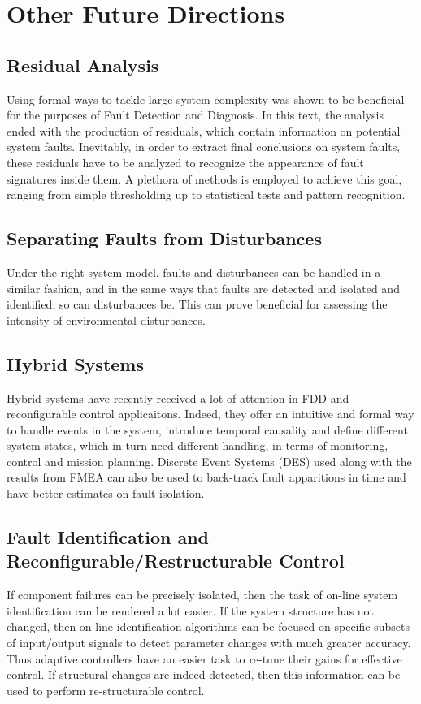 \chapter{Other Future Directions}

\section{Residual Analysis}
Using formal ways to tackle large system complexity was shown to be beneficial for the purposes of Fault Detection and Diagnosis. In this text, the analysis ended with the production of residuals, which contain information on potential system faults. Inevitably, in order to extract final conclusions on system faults, these residuals have to be analyzed to recognize the appearance of fault signatures inside them. A plethora of methods is employed to achieve this goal, ranging from simple thresholding up to statistical tests and pattern recognition.

\section{Separating Faults from Disturbances}
Under the right system model, faults and disturbances can be handled in a similar fashion, and in the same ways that faults are detected and isolated and identified, so can disturbances be. This can prove beneficial for assessing the intensity of environmental disturbances.

\section{Hybrid Systems}
Hybrid systems have recently received a lot of attention in FDD and reconfigurable control applicaitons. Indeed, they offer an intuitive and formal way to handle events in the system, introduce temporal causality and define different system states, which in turn need different handling, in terms of monitoring, control and mission planning. Discrete Event Systems (DES) used along with the results from FMEA can also be used to back-track fault apparitions in time and have better estimates on fault isolation.

\section{Fault Identification and Reconfigurable/Restructurable Control}
If component failures can be precisely isolated, then the task of on-line system identification can be rendered a lot easier. If the system structure has not changed, then on-line identification algorithms can be focused on specific subsets of input/output signals to detect parameter changes with much greater accuracy. Thus adaptive controllers have an easier task to re-tune their gains for effective control. If structural changes are indeed detected, then this information can be used to perform re-structurable control.

